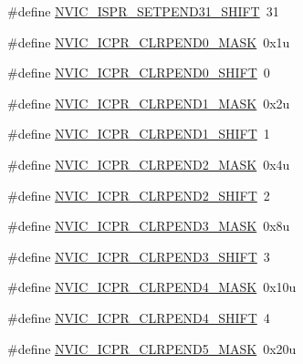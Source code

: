 \begin{DoxyCompactItemize}
\item 
\#define \hyperlink{group___n_v_i_c___register___masks_ga6cb7e86222fa58880088f838de53fa6a}{N\+V\+I\+C\+\_\+\+I\+S\+P\+R\+\_\+\+S\+E\+T\+P\+E\+N\+D31\+\_\+\+S\+H\+I\+FT}~31
\item 
\#define \hyperlink{group___n_v_i_c___register___masks_ga675324014fd8a7f3e8cdcfdd6c4fe014}{N\+V\+I\+C\+\_\+\+I\+C\+P\+R\+\_\+\+C\+L\+R\+P\+E\+N\+D0\+\_\+\+M\+A\+SK}~0x1u
\item 
\#define \hyperlink{group___n_v_i_c___register___masks_ga93c627b062992fecb45d91091ed61b5a}{N\+V\+I\+C\+\_\+\+I\+C\+P\+R\+\_\+\+C\+L\+R\+P\+E\+N\+D0\+\_\+\+S\+H\+I\+FT}~0
\item 
\#define \hyperlink{group___n_v_i_c___register___masks_gac5401d730a4ab83cd12e39c73fd450a7}{N\+V\+I\+C\+\_\+\+I\+C\+P\+R\+\_\+\+C\+L\+R\+P\+E\+N\+D1\+\_\+\+M\+A\+SK}~0x2u
\item 
\#define \hyperlink{group___n_v_i_c___register___masks_gaaa3b04fcc1513dab45dc6408590f63cc}{N\+V\+I\+C\+\_\+\+I\+C\+P\+R\+\_\+\+C\+L\+R\+P\+E\+N\+D1\+\_\+\+S\+H\+I\+FT}~1
\item 
\#define \hyperlink{group___n_v_i_c___register___masks_gaad12fd31e3b32f03992bb8b8d5d6774e}{N\+V\+I\+C\+\_\+\+I\+C\+P\+R\+\_\+\+C\+L\+R\+P\+E\+N\+D2\+\_\+\+M\+A\+SK}~0x4u
\item 
\#define \hyperlink{group___n_v_i_c___register___masks_ga7ed95a5dfedb8c8e28339041b7783b31}{N\+V\+I\+C\+\_\+\+I\+C\+P\+R\+\_\+\+C\+L\+R\+P\+E\+N\+D2\+\_\+\+S\+H\+I\+FT}~2
\item 
\#define \hyperlink{group___n_v_i_c___register___masks_gaec01eb7138d6ab47f91932de923a2bdd}{N\+V\+I\+C\+\_\+\+I\+C\+P\+R\+\_\+\+C\+L\+R\+P\+E\+N\+D3\+\_\+\+M\+A\+SK}~0x8u
\item 
\#define \hyperlink{group___n_v_i_c___register___masks_ga3760822721ca7d88069f7a81da36f809}{N\+V\+I\+C\+\_\+\+I\+C\+P\+R\+\_\+\+C\+L\+R\+P\+E\+N\+D3\+\_\+\+S\+H\+I\+FT}~3
\item 
\#define \hyperlink{group___n_v_i_c___register___masks_ga9d85cb32c7aca8f89b757cd84d705e9e}{N\+V\+I\+C\+\_\+\+I\+C\+P\+R\+\_\+\+C\+L\+R\+P\+E\+N\+D4\+\_\+\+M\+A\+SK}~0x10u
\item 
\#define \hyperlink{group___n_v_i_c___register___masks_gab2536b9de2f1373a1469d816b8043a6d}{N\+V\+I\+C\+\_\+\+I\+C\+P\+R\+\_\+\+C\+L\+R\+P\+E\+N\+D4\+\_\+\+S\+H\+I\+FT}~4
\item 
\#define \hyperlink{group___n_v_i_c___register___masks_ga90637bad5b91d14e7af3218c2e9044e0}{N\+V\+I\+C\+\_\+\+I\+C\+P\+R\+\_\+\+C\+L\+R\+P\+E\+N\+D5\+\_\+\+M\+A\+SK}~0x20u

\end{DoxyCompactItemize}
